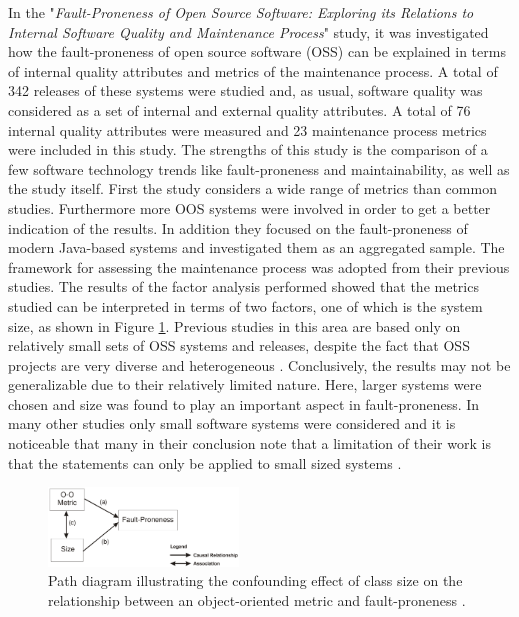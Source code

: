 In the "\textit{Fault-Proneness of Open Source Software: Exploring its Relations to
Internal Software Quality and Maintenance Process}" \cite{kozlov2013fault} study, it was investigated how the fault-proneness of open source software (OSS) can be explained in terms of internal quality attributes and metrics of the maintenance process. A total of 342 releases of these systems were studied and, as usual, software quality was considered as a set of internal and external quality attributes. A total of 76 internal quality attributes were measured and 23 maintenance process metrics were included in this study. The strengths of this study is the comparison of a few software technology trends like fault-proneness and maintainability, as well as the study itself. First the study considers a wide range of metrics than common studies. Furthermore more OOS systems were involved in order to get a better indication of the results. In addition they focused on the fault-proneness of modern Java-based systems and investigated them as an aggregated sample. The framework for assessing the maintenance process was adopted from their previous studies. The results of the factor analysis performed showed that the metrics studied can be interpreted in terms of two factors, one of which is the system size, as shown in Figure \ref{figSize}. Previous studies in this area are based only on relatively small sets of OSS systems and releases, despite the fact that OSS projects are very diverse and heterogeneous \cite{kozlov2013fault}. Conclusively, the results may not be generalizable due to their relatively limited nature. Here, larger systems were chosen and size was found to play an important aspect in fault-proneness. In many other studies only small software systems were considered and it is noticeable that many in their conclusion note that a limitation of their work is that the statements can only be applied to small sized systems \cite{kozlov2013fault, b7radjenovic2013software}.

\begin{figure}[htbp]
	\centerline{\includegraphics[width=0.45\textwidth]{pictures/faultyclasses2.png}}
	\caption{Path diagram illustrating the confounding effect of class size on the relationship between an object-oriented metric and fault-proneness \cite{b10el2001prediction}.}
	\label{figSize}
\end{figure}

